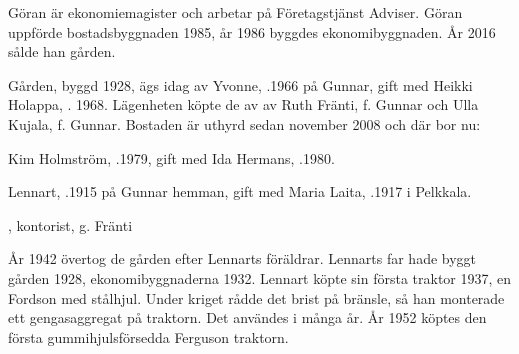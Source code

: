 Göran är ekonomiemagister och arbetar på Företagstjänst Adviser. Göran uppförde bostadsbyggnaden 1985, år 1986 byggdes ekonomibyggnaden. År 2016 sålde han gården.






Gården, byggd 1928, ägs idag av Yvonne, .1966 på Gunnar, gift med Heikki Holappa, . 1968. Lägenheten köpte de av av Ruth Fränti, f. Gunnar och Ulla Kujala, f. Gunnar. Bostaden är uthyrd sedan november 2008 och där bor nu:

Kim Holmström, .1979, gift med Ida Hermans, .1980.
\begin{jhchildren}
  \item {}
  \item {}
  \item {}
\end{jhchildren}


Lennart, .1915 på Gunnar hemman, gift med Maria Laita, .1917 i Pelkkala.
\begin{jhchildren}
  \item {}
  \item {}
  \item {}
  \item {}, kontorist, g. Fränti
  \item {}
  \item {}
\end{jhchildren}


År 1942 övertog de gården efter Lennarts föräldrar. Lennarts far hade byggt gården 1928, ekonomibyggnaderna 1932. Lennart köpte sin första traktor 1937, en Fordson med stålhjul. Under kriget rådde det brist på bränsle, så han monterade ett gengasaggregat på traktorn. Det användes i många år. År 1952 köptes den första gummihjulsförsedda Ferguson traktorn.

